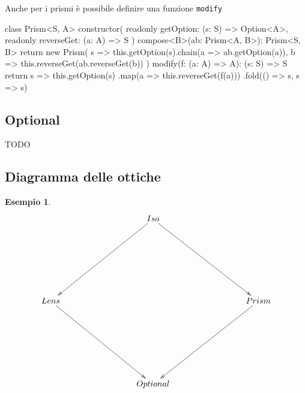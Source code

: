 \documentclass[12pt]{article}
\theoremstyle{definition}
\newtheorem{example}{Esempio}[section]
\newenvironment{code}
  {\vspace{0.5cm} \VerbatimEnvironment\begin{typescriptcode}}
  {\end{typescriptcode} \vspace{0.2cm}}
\begin{document}
Anche per i prismi è possibile definire una funzione \texttt{modify}

\begin{code}
class Prism<S, A> {
  constructor(
    readonly getOption: (s: S) => Option<A>,
    readonly reverseGet: (a: A) => S
  ) {}
  compose<B>(ab: Prism<A, B>): Prism<S, B> {
    return new Prism(
      s => this.getOption(s).chain(a => ab.getOption(a)),
      b => this.reverseGet(ab.reverseGet(b))
    )
  }
  modify(f: (a: A) => A): (s: S) => S {
    return s =>
      this.getOption(s)
        .map(a => this.reverseGet(f(a)))
        .fold(() => s, s => s)
  }
}
\end{code}

\subsection{Optional}

TODO

\subsection{Diagramma delle ottiche}

\begin{example}
\[
\xymatrixrowsep{3cm}
\xymatrixcolsep{3cm}
\xymatrix{
  & Iso \ar[dl] \ar[dr] \\
  Lens \ar[dr] & & Prism \ar[dl] \\
  & Optional \\
}
\]
\end{example}
\end{document}
